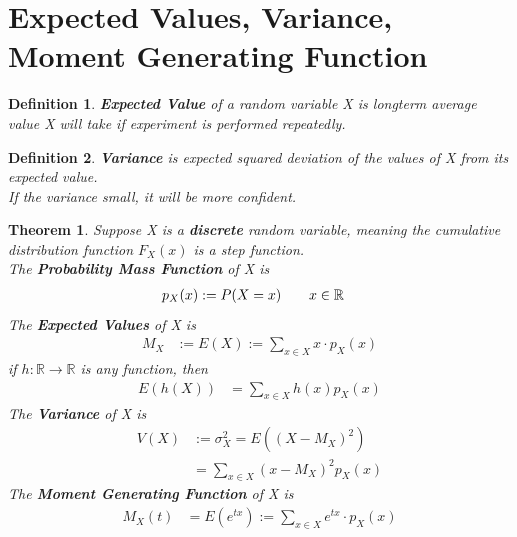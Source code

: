 \documentclass[11pt,oneside]{book}
\theoremstyle{break}
\theoremstyle{break}
\newtheorem{thm}{Theorem}[section]
\newtheorem{defn}{Definition}[corL]
\newcommand{\R}{\mathbb{R}}
\newcommand{\X}{x}
\begin{document}
\section[Expected Values, Variance, Moment Generating Function]{Expected Values, Variance, Moment Generating Function}
\begin{defn}
\textbf{Expected Value} of a random variable X is longterm average value X will take if experiment is performed repeatedly.  
\end{defn}
\begin{defn}
\textbf{Variance} is expected squared deviation of the values of X from its expected value. \\
If the variance small, it will be more confident.
\end{defn}
\begin{thm}
Suppose X is a \textbf{discrete} random variable, meaning the cumulative distribution function $F_X(x)$ is a step function. \\
The \textbf{Probability Mass Function} of X is \begin{align*}
p_X(\X)&:=P(X=\X)\text{\qquad} \X\in \mathbb{R}
\end{align*}
The \textbf{Expected Values} of X is \begin{align*}
M_X&:=E(X):=\sum_{\X\in X}\X \cdot p_X(\X)
\end{align*}
if $h:\R\rightarrow \R$ is any function, then\begin{align*}
E(h(X))&=\sum_{\X\in X}h(\X)p_X(\X)
\end{align*}
The \textbf{Variance} of X is \begin{align*}
V(X)&:=\sigma_X^2=E((X-M_X)^2)\\
&=\sum_{\X\in X}(\X-M_X)^2p_X(\X)
\end{align*}
The \textbf{Moment Generating Function }of X is \begin{align*}
M_X(t)&=E(e^{tx}):=\sum_{\X\in X}e^{t\X}\cdot p_X(\X)
\end{align*}
\end{thm}
\end{document}

